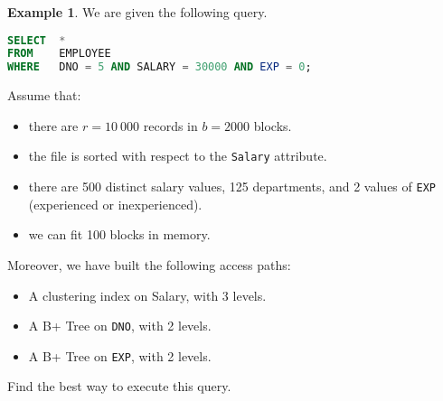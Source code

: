 \documentclass[a4paper, openany]{memoir}
\theoremstyle{definition}
\newtheorem{example}[subsection]{Example}
\begin{document}
\begin{example}
    We are given the following query.
\begin{lstlisting}[language=SQL]
SELECT  *
FROM    EMPLOYEE
WHERE   DNO = 5 AND SALARY = 30000 AND EXP = 0;
\end{lstlisting}
    Assume that:
    \begin{itemize}
        \item there are $r = 10 \ 000$ records in $b = 2000$ blocks.
        \item the file is sorted with respect to the \texttt{Salary} attribute.
        \item there are 500 distinct salary values, 125 departments, and 2 values of \texttt{EXP} (experienced or inexperienced). 
        \item we can fit 100 blocks in memory.
    \end{itemize}
    Moreover, we have built the following access paths:
    \begin{itemize}
        \item A clustering index on Salary, with 3 levels.
        \item A B+ Tree on \texttt{DNO}, with 2 levels.
        \item A B+ Tree on \texttt{EXP}, with 2 levels.
    \end{itemize}
    Find the best way to execute this query.
\end{example}
\end{document}
